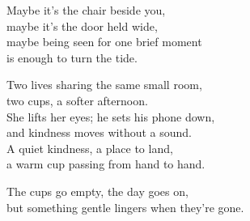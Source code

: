 \begin{lyrics}
Maybe it’s the chair beside you,\\
maybe it’s the door held wide,\\
maybe being seen for one brief moment\\
is enough to turn the tide.

Two lives sharing the same small room,\\
two cups, a softer afternoon.\\
She lifts her eyes; he sets his phone down,\\
and kindness moves without a sound.\\
A quiet kindness, a place to land,\\
a warm cup passing from hand to hand.

The cups go empty, the day goes on,\\
but something gentle lingers when they’re gone.
\end{lyrics}

